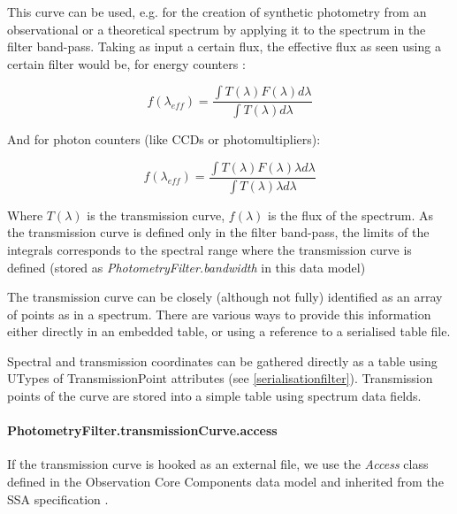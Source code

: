 \documentclass[11pt,a4paper]{ivoa}
\begin{document}

\par

This curve can be used, e.g. for the creation of synthetic photometry
\citep{1996BaltA...5..459S,2004A&A...422..205G} from an observational
or a theoretical spectrum by applying it to the spectrum in the filter band-pass.
Taking as input a certain flux, the effective flux as seen using a certain
filter would be, for energy counters \citep{2007ASPC..364..227M}:

\begin{equation} \label{eq:14}
f(\lambda_{eff}) = \frac{\int T(\lambda)F(\lambda)d\lambda}{\int T(\lambda)d\lambda}
\end{equation}

And for photon counters (like CCDs or photomultipliers):

\begin{equation} \label{eq:15}
f(\lambda_{eff}) = \frac{\int T(\lambda)F(\lambda)\lambda d\lambda}{\int T(\lambda)\lambda d\lambda}
\end{equation}

Where $T(\lambda)$ is the transmission curve, $f(\lambda)$ is the flux of
the spectrum. As the transmission curve is defined only in the filter
band-pass, the limits of the integrals corresponds to the spectral range where
the transmission curve is defined (stored as \textit{PhotometryFilter.bandwidth}
in this data model)
\par

The transmission curve can be closely (although not fully) identified as an array
of points as in a spectrum. There are various ways to provide this information
either directly in an embedded table, or using a reference to a serialised table
file.
\par

Spectral and transmission coordinates can be gathered directly as a table using
UTypes of TransmissionPoint attributes (see \ref{serialisationfilter}). Transmission points 
of the curve are stored into a simple table using spectrum data fields.
\par

\paragraph{PhotometryFilter.transmissionCurve.access}
If the transmission curve is hooked as an external file, we use the \textit{Access} class
defined in the Observation Core Components data model \citep{2017ivoa.spec.0509L} and inherited
from the SSA specification \citep{2012ivoa.spec.0210T}.
\par
\end{document}
